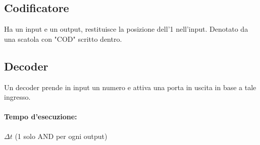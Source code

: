 \documentclass[12pt,a4paper]{article}
\begin{document}
\subsection{Codificatore}
Ha un input e un output, restituisce la posizione dell'1 nell'input. Denotato da una scatola con "COD" scritto dentro.

\subsection{Decoder}
Un decoder prende in input un numero e attiva una porta in uscita in base a tale ingresso.\\
\paragraph{Tempo d'esecuzione:} $\Delta t$ (1 solo AND per ogni output)
\end{document}
